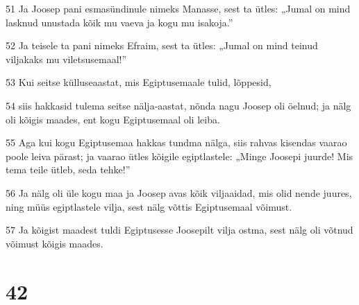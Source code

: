 \par 51 Ja Joosep pani esmasündinule nimeks Manasse, sest ta ütles: „Jumal on mind lasknud unustada kõik mu vaeva ja kogu mu isakoja.”
\par 52 Ja teisele ta pani nimeks Efraim, sest ta ütles: „Jumal on mind teinud viljakaks mu viletsusemaal!”
\par 53 Kui seitse külluseaastat, mis Egiptusemaale tulid, lõppesid,
\par 54 siis hakkasid tulema seitse nälja-aastat, nõnda nagu Joosep oli öelnud; ja nälg oli kõigis maades, ent kogu Egiptusemaal oli leiba.
\par 55 Aga kui kogu Egiptusemaa hakkas tundma nälga, siis rahvas kisendas vaarao poole leiva pärast; ja vaarao ütles kõigile egiptlastele: „Minge Joosepi juurde! Mis tema teile ütleb, seda tehke!”
\par 56 Ja nälg oli üle kogu maa ja Joosep avas kõik viljaaidad, mis olid nende juures, ning müüs egiptlastele vilja, sest nälg võttis Egiptusemaal võimust.
\par 57 Ja kõigist maadest tuldi Egiptusesse Joosepilt vilja ostma, sest nälg oli võtnud võimust kõigis maades.

\chapter{42}


